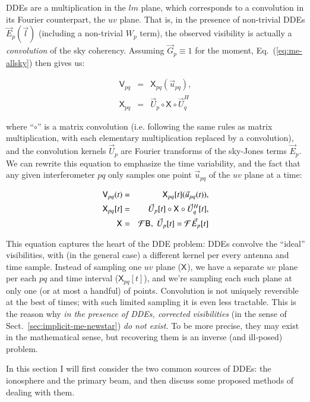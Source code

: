 \documentclass[referee]{aa}
\newcommand{\herm}{H}
\newcommand{\jones}[2]{\vec {#1}_{#2}}
\newcommand{\jonesT}[2]{\vec {#1}^{\herm}_{#2}}
\newcommand{\coh}[2]{\mathsf{{#1}}_{{#2}}}
\begin{document}
DDEs are a multiplication in the $lm$ plane, which corresponds to a convolution in its Fourier counterpart, the $uv$ plane. That is, in the presence of non-trivial DDEs $\jones{E}{p}(\vec l)$ (including a non-trivial $W_p$ term), the observed visibility is actually a \emph{convolution} of the sky coherency. Assuming $\jones{G}{p}\equiv1$ for the moment, Eq.~(\ref{eq:me-allsky}) then gives us:

\begin{eqnarray}\label{eq:dde-convolution}
\nonumber \coh{V}{pq} & = & \coh{X}{pq}(\vec u_{pq}), \\
\coh{X}{pq} &=& \jones{U}{p} \circ \coh{X}{} \circ \jonesT{U}{q}
\end{eqnarray}

where ``$\circ$'' is a matrix convolution (i.e. following the same rules as matrix multiplication, with each elementary multiplication replaced by a convolution), and the convolution kernels $\jones{U}{p}$ are Fourier transforms of the
sky-Jones terms $\jones{E}{p}$. We can rewrite this equation to emphasize the time variability, and the fact that any given interferometer $pq$ only samples one point $\vec u_{pq}$ of the $uv$ plane at a time:

\begin{eqnarray}\label{eq:dde-convolution-t}
\coh{V}{pq}(t) & = & \coh{X}{pq}[t](\vec u_{pq}(t)), \\
\nonumber \coh{X}{pq}[t] & = & \jones{U}{p}[t] \circ \coh{X}{} \circ \jonesT{U}{q}[t], \\
\nonumber \coh{X}{} & = & {\cal F} \coh{B}{}, \; \jones{U}{p}[t] = {\cal F}\jones{E}{p}[t]
\end{eqnarray}

This equation captures the heart of the DDE problem: DDEs convolve the ``ideal'' visibilities, with (in the general case) a different kernel per every antenna and time sample. Instead of sampling one $uv$ plane ($\coh{X}{}$), we have a separate $uv$ plane per each $pq$ and time interval ($\coh{X}{pq}[t]$), and we're sampling each such plane at only one (or at most a handful) of points. Convolution is not uniquely reversible at the best of times; with such limited sampling it is even less tractable. This is the reason why \emph{in the presence of DDEs, corrected visibilities} (in the sense of Sect.~\ref{sec:implicit-me-newstar}) \emph{do not exist.} To be more precise, they may exist in the mathematical sense, but recovering them is an inverse (and ill-posed) problem.

In this section I will first consider the two common sources of DDEs: the ionosphere and the primary beam, and
then discuss some proposed methods of dealing with them.
\end{document}
